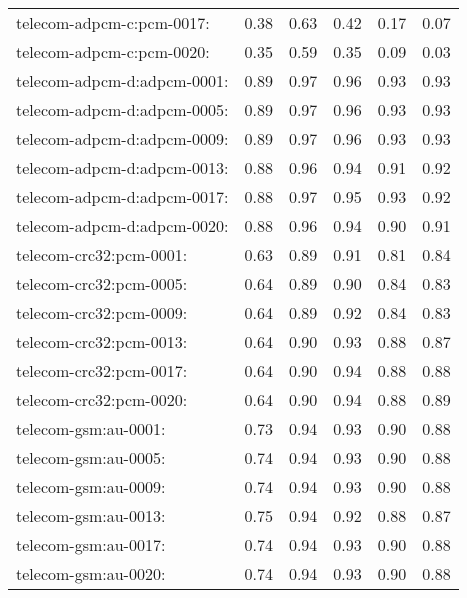 \begin{longtable}{lrrrrr}
telecom-adpcm-c:pcm-0017: & 0.38 & 0.63 & 0.42 & 0.17 & 0.07 \\
telecom-adpcm-c:pcm-0020: & 0.35 & 0.59 & 0.35 & 0.09 & 0.03 \\
telecom-adpcm-d:adpcm-0001: & 0.89 & 0.97 & 0.96 & 0.93 & 0.93 \\
telecom-adpcm-d:adpcm-0005: & 0.89 & 0.97 & 0.96 & 0.93 & 0.93 \\
telecom-adpcm-d:adpcm-0009: & 0.89 & 0.97 & 0.96 & 0.93 & 0.93 \\
telecom-adpcm-d:adpcm-0013: & 0.88 & 0.96 & 0.94 & 0.91 & 0.92 \\
telecom-adpcm-d:adpcm-0017: & 0.88 & 0.97 & 0.95 & 0.93 & 0.92 \\
telecom-adpcm-d:adpcm-0020: & 0.88 & 0.96 & 0.94 & 0.90 & 0.91 \\
telecom-crc32:pcm-0001: & 0.63 & 0.89 & 0.91 & 0.81 & 0.84 \\
telecom-crc32:pcm-0005: & 0.64 & 0.89 & 0.90 & 0.84 & 0.83 \\
telecom-crc32:pcm-0009: & 0.64 & 0.89 & 0.92 & 0.84 & 0.83 \\
telecom-crc32:pcm-0013: & 0.64 & 0.90 & 0.93 & 0.88 & 0.87 \\
telecom-crc32:pcm-0017: & 0.64 & 0.90 & 0.94 & 0.88 & 0.88 \\
telecom-crc32:pcm-0020: & 0.64 & 0.90 & 0.94 & 0.88 & 0.89 \\
telecom-gsm:au-0001: & 0.73 & 0.94 & 0.93 & 0.90 & 0.88 \\
telecom-gsm:au-0005: & 0.74 & 0.94 & 0.93 & 0.90 & 0.88 \\
telecom-gsm:au-0009: & 0.74 & 0.94 & 0.93 & 0.90 & 0.88 \\
telecom-gsm:au-0013: & 0.75 & 0.94 & 0.92 & 0.88 & 0.87 \\
telecom-gsm:au-0017: & 0.74 & 0.94 & 0.93 & 0.90 & 0.88 \\
telecom-gsm:au-0020: & 0.74 & 0.94 & 0.93 & 0.90 & 0.88 \\
\end{longtable}
